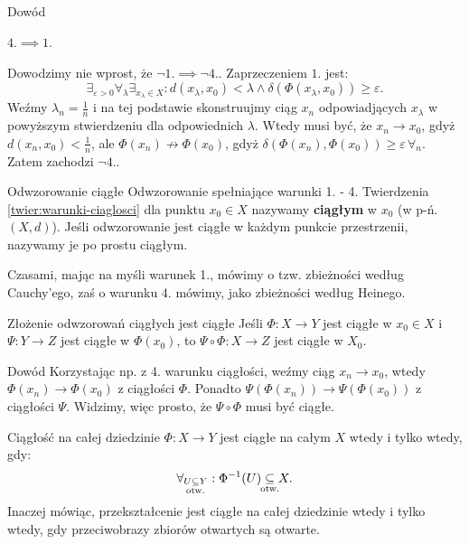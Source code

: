\documentclass{article}
\numberwithin{defi}{section}
\numberwithin{defi}{section}
\newcommand{\subotw}{\underset{\clap{\scriptsize otw.}}{\subseteq}}
\providecommand{\eps}{\varepsilon}
\begin{document}
\begin{dow}{Dowód}
    \paragraph{$4. \implies 1.$} Dowodzimy nie wprost, że $\neg 1. \implies \neg 4.$. Zaprzeczeniem $1.$ jest: \begin{equation*}
        \exists_{\eps > 0} \forall_\lambda \exists_{x_\lambda \in X}: d(x_\lambda, x_0) < \lambda \wedge \delta( \Phi(x_\lambda, x_0)) \geqslant \eps.
    \end{equation*} Weźmy $\lambda_n = \frac{1}{n}$ i na tej podstawie skonstruujmy ciąg $x_n$ odpowiadjących $x_\lambda$ w powyższym stwierdzeniu dla odpowiednich $\lambda$. Wtedy musi być, że $x_n \to x_0$, gdyż $d(x_n, x_0) < \frac{1}{n}$, ale $\Phi(x_n) \nrightarrow \Phi(x_0)$, gdyż $\delta( \Phi(x_n), \Phi(x_0)) \geqslant \eps \, \forall_n$. Zatem zachodzi $\neg 4.$.

\end{dow}


    \begin{defr}{Odwzorowanie ciągłe}\label{defr:ciaglosc}
        Odwzorowanie spełniające warunki 1. - 4. Twierdzenia \ref{twier:warunki-ciaglosci} dla punktu $x_0 \in X$ nazywamy \textbf{ciągłym} w $x_0$ (w p-ń. $(X, d)$). Jeśli odwzorowanie jest ciągłe w każdym punkcie przestrzenii, nazywamy je po prostu ciągłym.
    \end{defr}
        Czasami, mając na myśli warunek 1., mówimy o tzw. zbieżności według Cauchy'ego, zaś o warunku 4. mówimy, jako zbieżności według Heinego.

    \begin{twier}{Złożenie odwzorowań ciągłych jest ciągłe}
        Jeśli $\Phi: X \to Y$ jest ciągłe w $x_0 \in X$ i $\Psi: Y \to Z$ jest ciągłe w $\Phi(x_0)$, to $\Psi \circ \Phi: X \to Z$ jest ciągłe w $X_0$.
    \end{twier}

    \begin{dow}{Dowód}
        Korzystając np. z 4. warunku ciągłości, weźmy ciąg $x_n \to x_0$, wtedy $\Phi(x_n) \to \Phi(x_0)$ z ciągłości $\Phi$. Ponadto $\Psi(\Phi(x_n)) \to \Psi(\Phi(x_0))$ z ciągłości $\Psi$. Widzimy, więc prosto, że $\Psi \circ \Phi$ musi być ciągłe.
    \end{dow}

    \begin{twier}{Ciągłość na całej dziedzinie}
        $\Phi: X \to Y$ jest ciągłe na całym $X$ wtedy i tylko wtedy, gdy: \begin{equation}
            \forall_{U \subotw Y}: \Phi^{-1}(U) \subotw X.
        \end{equation} Inaczej mówiąc, przekształcenie jest ciągłe na całej dziedzinie wtedy i tylko wtedy, gdy przeciwobrazy zbiorów otwartych są otwarte.
    \end{twier}
\end{document}
